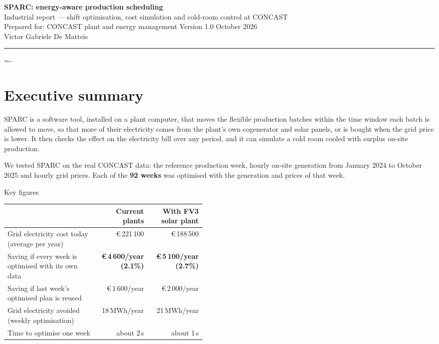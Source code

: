 \documentclass[10pt,a4paper]{scrartcl}
\makeatletter
\newcommand{\Eur}[1]{\euro\,#1}
\renewcommand{\emph}[1]{\textcolor{accent}{#1}}
\newcommand{\NeedSpace}[1]{\par\begingroup\dimen@=\pagegoal\advance\dimen@-\pagetotal
    \ifdim\dimen@<#1\relax\newpage\fi\endgroup}
\newcommand{\RuleSection}[1]{%
    \NeedSpace{10\baselineskip}%
    \section{#1}%
    \vspace{0.2em}{\color{accent!35}\hrule height 0.4pt}\vspace{0.3em}%
  }
\makeatother
\begin{document}

  \begin{center}
    {\Huge\bfseries\color{accent} SPARC: energy-aware production scheduling}\\[0.25cm]
    {\large Industrial report --- shift optimisation, cost simulation and cold-room control at CONCAST}\\[0.2cm]
    {\small Prepared for: CONCAST plant and energy management \quad\textbullet\quad Version 1.0 \quad\textbullet\quad October 2026}\\[0.1cm]
    {\small Victor Gabriele De Matteis}\\[0.2cm]
    {\color{accent!35}\hrule height 0.5pt}
  \end{center}

  \vspace{0.3em}

  \RuleSection{Executive summary}
  \label{sec:summary}

  SPARC is a software tool, installed on a plant computer, that \emph{moves the flexible
  production batches} within the time window each batch is allowed to move, so that more of their
  electricity comes from the plant's own cogenerator and solar panels, or is bought when the grid
  price is lower. It then checks the effect on the electricity bill over any period, and it can
  simulate a cold room cooled with surplus on-site production.

  We tested SPARC on the real CONCAST data: the reference production week, hourly on-site
  generation from January 2024 to October 2025 and hourly grid prices. Each of the
  \textbf{92 weeks} was optimised with the generation and prices of that week.

  \begin{keybox}{Key figures}
    \begin{tabularx}{\linewidth}{@{}L{0.46\linewidth} R R@{}}
      & \textbf{Current plants} & \textbf{With FV3 solar plant} \\
      \midrule
      Grid electricity cost today (average per year)            & \Eur{221\,100} & \Eur{188\,500} \\
      Saving if every week is optimised with its own data         & \textbf{\Eur{4\,600}/year (2.1\%)} & \textbf{\Eur{5\,100}/year (2.7\%)} \\
      Saving if last week's optimised plan is reused             & \Eur{1\,600}/year & \Eur{2\,000}/year \\
      Grid electricity avoided (weekly optimisation)              & 18\,MWh/year & 21\,MWh/year \\
      Time to optimise one week                                    & about 2\,s & about 1\,s \\
    \end{tabularx}
  \end{keybox}
\end{document}
